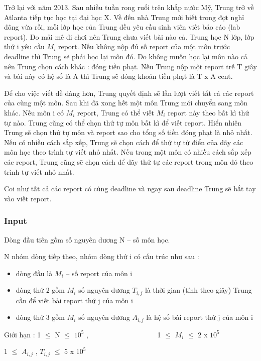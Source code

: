 

Trở lại với năm 2013. Sau nhiều tuần rong ruổi trên khắp nước Mỹ, Trung trở về Atlanta tiếp tục học tại đại học X. Về đến nhà Trung mới biết trong đợt nghỉ đông vừa rồi, mỗi lớp học của Trung đều yêu cầu sinh viên viết báo cáo (lab report). Do mải mê đi chơi nên Trung chưa viết bài nào cả. Trung học N lớp, lớp thứ i yêu cầu $M_{i}$ report. Nếu không nộp đủ số report của một môn trước deadline thì Trung sẽ phải học lại môn đó. Do không muốn học lại môn nào cả nên Trung chọn cách khác : đóng tiền phạt. Nếu Trung nộp một report trễ T giây và bài này có hệ số là A thì Trung sẽ đóng khoản tiền phạt là T x A cent.

Để cho việc viết dễ dàng hơn, Trung quyết định sẽ lần lượt viết tất cả các report của cùng một môn. Sau khi đã xong hết một môn Trung mới chuyển sang môn khác. Nếu môn i có $M_{i}$ report, Trung có thể viết $M_{i}$ report này theo bất kì thứ tự nào. Trung cũng có thể chọn thứ tự môn bất kì để viết report. Hiển nhiên Trung sẽ chọn thứ tự môn và report sao cho tổng số tiền đóng phạt là nhỏ nhất. Nếu có nhiều cách sắp xếp, Trung sẽ chọn cách để thứ tự từ điển của dãy các môn học theo trình tự viết nhỏ nhất. Nếu trong một môn có nhiều cách sắp xếp các report, Trung cũng sẽ chọn cách để dãy thứ tự các report trong môn đó theo trình tự viết nhỏ nhất.

Coi như tất cả các report có cùng deadline và ngay sau deadline Trung sẽ bắt tay vào viết report.

\subsubsection{Input}

Dòng đầu tiên gồm số nguyên dương N – số môn học.


N nhóm dòng tiếp theo, nhóm dòng thứ i có cấu trúc như sau :
\begin{itemize}
	\item dòng đầu là $M_{i}$ – số report của môn i
	\item dòng thứ 2 gồm $M_{i}$ số nguyên dương $T_{i,j}$ là thời gian (tính theo giây) Trung cần để viết bài report thứ j của môn i
	\item dòng thứ 3 gồm $M_{i}$ số nguyên dương $A_{i,j}$ là hệ số bài report thứ j của môn i
\end{itemize}

Giới hạn : 1  $\le$  N  $\le$  $10^{5}$ ,                    1  $\le$  $M_{i}$  $\le$  2 x $10^{5}$


1  $\le$  $A_{i,j}$ , $T_{i,j}$  $\le$  5 x $10^{5}$


